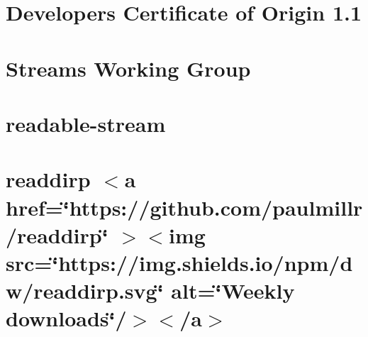 \documentclass[twoside]{book}
\newcommand{\+}{\discretionary{\mbox{\scriptsize$\hookleftarrow$}}{}{}}
\begin{document}
\chapter{Developer\textquotesingle{}s Certificate of Origin 1.1}
\label{md__c___users_vaishnavi_jadhav__desktop__developer_code_mean_stack_example_client_node_modules_r11df106e0f7363a2de988a84ee05dc22}

\chapter{Streams Working Group}
\label{md__c___users_vaishnavi_jadhav__desktop__developer_code_mean_stack_example_client_node_modules_r4237f501696095a7ba3d6a4ce1aa30bc}

\chapter{readable-\/stream}
\label{md__c___users_vaishnavi_jadhav__desktop__developer_code_mean_stack_example_client_node_modules_readable_stream__r_e_a_d_m_e}

\chapter{readdirp \texorpdfstring{$<$}{<}a href=\char`\"{}https\+://github.\+com/paulmillr/readdirp\char`\"{} \texorpdfstring{$>$}{>}\texorpdfstring{$<$}{<}img src=\char`\"{}https\+://img.\+shields.\+io/npm/dw/readdirp.\+svg\char`\"{} alt=\char`\"{}\+Weekly downloads\char`\"{}/\texorpdfstring{$>$}{>}\texorpdfstring{$<$}{<}/a\texorpdfstring{$>$}{>}}
\label{md__c___users_vaishnavi_jadhav__desktop__developer_code_mean_stack_example_client_node_modules_readdirp__r_e_a_d_m_e}

\end{document}
